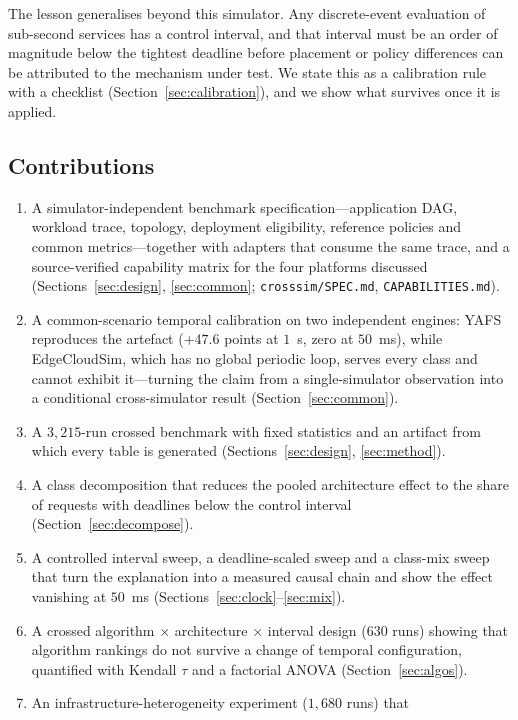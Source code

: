\documentclass[journal,10pt]{IEEEtran}
\begin{document}
The lesson generalises beyond this simulator. Any discrete-event evaluation of
sub-second services has a control interval, and that interval must be an order
of magnitude below the tightest deadline before placement or policy differences
can be attributed to the mechanism under test. We state this as a calibration
rule with a checklist
(Section~\ref{sec:calibration}), and we show what survives once it is applied.

\subsection{Contributions}
\begin{enumerate}
\item A simulator-independent benchmark specification---application DAG,
  workload trace, topology, deployment eligibility, reference policies and
  common metrics---together with adapters that consume the same trace, and a
  source-verified capability matrix for the four platforms discussed
  (Sections~\ref{sec:design}, \ref{sec:common}; \texttt{crosssim/SPEC.md},
  \texttt{CAPABILITIES.md}).
\item A common-scenario temporal calibration on two independent engines: YAFS
  reproduces the artefact ($+47.6$ points at $1$~s, zero at $50$~ms), while
  EdgeCloudSim, which has no global periodic loop, serves every class and cannot
  exhibit it---turning the claim from a single-simulator observation into a
  conditional cross-simulator result (Section~\ref{sec:common}).
\item A $3{,}215$-run crossed benchmark with fixed statistics and an artifact
  from which every table is generated (Sections~\ref{sec:design},
  \ref{sec:method}).
\item A class decomposition that reduces the pooled architecture effect to the
  share of requests with deadlines below the control interval
  (Section~\ref{sec:decompose}).
\item A controlled interval sweep, a deadline-scaled sweep and a class-mix
  sweep that turn the explanation into a measured causal chain and show the
  effect vanishing at $50$~ms (Sections~\ref{sec:clock}--\ref{sec:mix}).
\item A crossed algorithm $\times$ architecture $\times$ interval design
  ($630$ runs) showing that algorithm rankings do not survive a change of
  temporal configuration, quantified with Kendall $\tau$ and a factorial ANOVA
  (Section~\ref{sec:algos}).
\item An infrastructure-heterogeneity experiment ($1{,}680$ runs) that

\end{enumerate}
\end{document}
